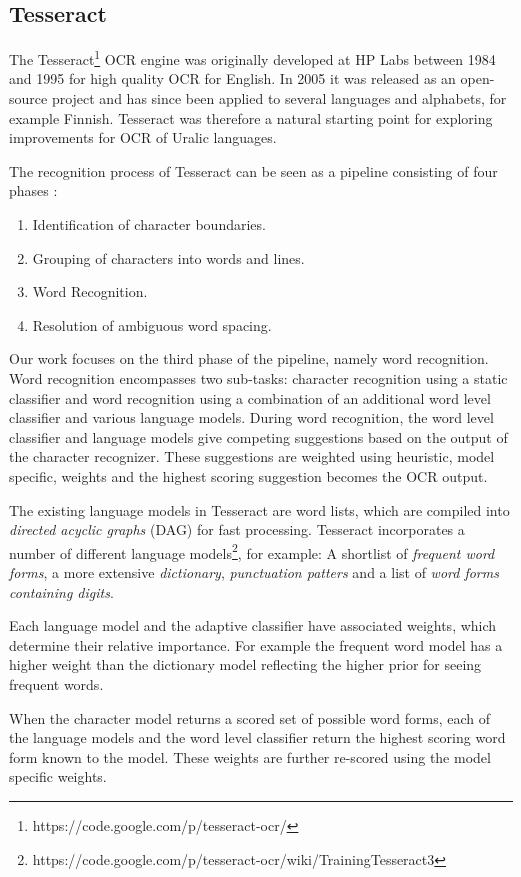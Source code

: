 \documentclass[b5paper]{article}
\begin{document}
\subsection{Tesseract}
The Tesseract\footnote{https://code.google.com/p/tesseract-ocr/} OCR
engine \cite{smith07} was originally developed at HP Labs between 1984
and 1995 for high quality OCR for English. In 2005 it was released as
an open-source project and has since been applied to several languages
and alphabets, for example Finnish. Tesseract was therefore a natural
starting point for exploring improvements for OCR of Uralic languages.

The recognition process of Tesseract can be seen as a pipeline
consisting of four phases \cite{smith07}:
\begin{enumerate}
\item Identification of character boundaries.
\item Grouping of characters into words and lines.
\item Word Recognition.
\item Resolution of ambiguous word spacing.
\end{enumerate}
Our work focuses on the third phase of the pipeline, namely word
recognition. Word recognition encompasses two sub-tasks: character
recognition using a static classifier and word recognition using a
combination of an additional word level classifier and various
language models. During word recognition, the word level classifier
and language models give competing suggestions based on the output of
the character recognizer. These suggestions are weighted using
heuristic, model specific, weights and the highest scoring suggestion
becomes the OCR output.

The existing language models in Tesseract are word lists, which are
compiled into {\it directed acyclic graphs} (DAG) for fast
processing. Tesseract incorporates a number of different language
models\footnote{https://code.google.com/p/tesseract-ocr/wiki/TrainingTesseract3},
for example: A shortlist of {\it frequent word forms}, a more
extensive {\it dictionary}, {\it punctuation patters} and a list of
{\it word forms containing digits}.

Each language model and the adaptive classifier have associated
weights, which determine their relative importance. For example the
frequent word model has a higher weight than the dictionary model
reflecting the higher prior for seeing frequent words. 

When the character model returns a scored set of possible word
forms, each of the language models and the word level classifier
return the highest scoring word form known to the model. These
weights are further re-scored using the model specific weights.
\end{document}
